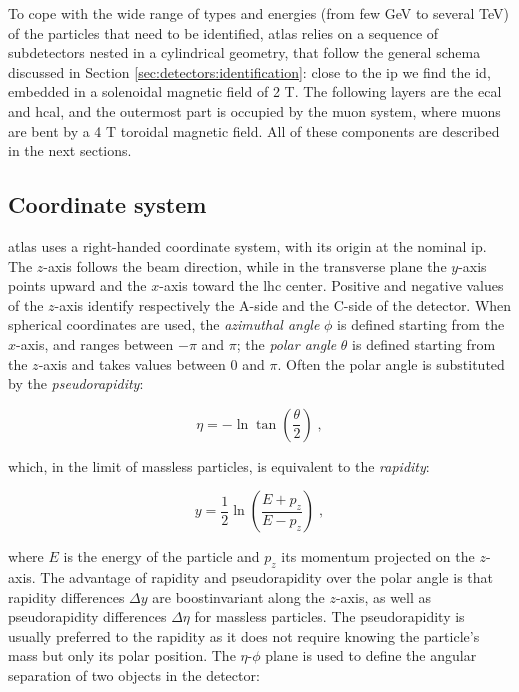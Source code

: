 To cope with the wide range of types and energies (from few GeV to several TeV) of the particles that need to be identified, \gls{atlas} relies on a sequence of subdetectors nested in a cylindrical geometry, that follow the general schema discussed in Section \ref{sec:detectors:identification}: close to the \gls{ip} we find the \gls{id}, embedded in a solenoidal magnetic field of 2 T. The following layers are the \gls{ecal} and \gls{hcal}, and the outermost part is occupied by the muon system, where muons are bent by a 4 T toroidal magnetic field. All of these components are described in the next sections.

\subsection{Coordinate system}

\gls{atlas} uses a right-handed coordinate system, with its origin at the nominal \gls{ip}. The $z$-axis follows the beam direction, while in the transverse plane the $y$-axis points upward and the $x$-axis toward the \gls{lhc} center. Positive and negative values of the $z$-axis identify respectively the A-side and the C-side of the detector. When spherical coordinates are used, the \textit{azimuthal angle} $\phi$ is defined starting from the $x$-axis, and ranges between $-\pi$ and $\pi$; the \textit{polar angle} $\theta$ is defined starting from the $z$-axis and takes values between $0$ and $\pi$. Often the polar angle is substituted by the \textit{pseudorapidity}: 
 
\begin{equation}
\label{eq:cern:eta}
\eta = - \ln\tan\left(\frac{\theta}{2}\right) \; ,
\end{equation}

\noindent which, in the limit of massless particles, is equivalent to the \textit{rapidity}:

\begin{equation}
\label{eq:cern:y}
y = \frac{1}{2} \ln\left(\frac{E + p_z}{E - p_z}\right) \; ,
\end{equation}

\noindent where $E$ is the energy of the particle and $p_z$ its momentum projected on the $z$-axis. 
The advantage of rapidity and pseudorapidity over the polar angle is that rapidity differences $\Delta y$ are boostinvariant
along the $z$-axis, as well as pseudorapidity differences $\Delta \eta$ for massless particles.
The pseudorapidity is usually preferred to the rapidity as it does not require
knowing the particle’s mass but only its polar position.
The $\eta$-$\phi$ plane is used to define the angular separation of two objects in the detector:


